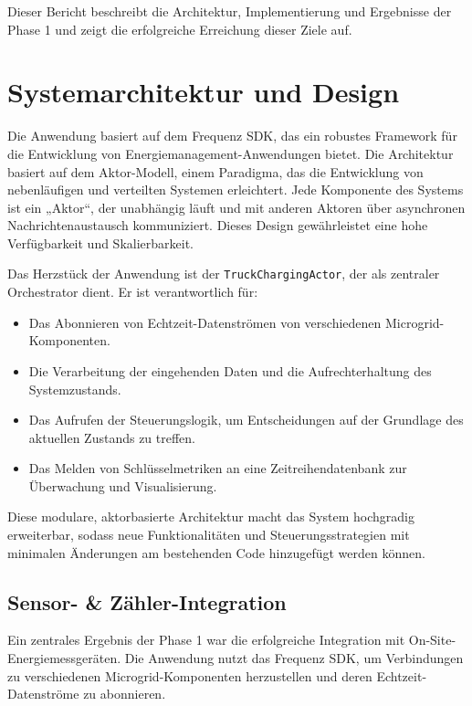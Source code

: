 \documentclass{article}
\begin{document}
Dieser Bericht beschreibt die Architektur, Implementierung und Ergebnisse der Phase 1 und zeigt die erfolgreiche Erreichung dieser Ziele auf.

\section{Systemarchitektur und Design}
Die Anwendung basiert auf dem Frequenz SDK, das ein robustes Framework für die Entwicklung von Energiemanagement-Anwendungen bietet. Die Architektur basiert auf dem Aktor-Modell, einem Paradigma, das die Entwicklung von nebenläufigen und verteilten Systemen erleichtert. Jede Komponente des Systems ist ein „Aktor“, der unabhängig läuft und mit anderen Aktoren über asynchronen Nachrichtenaustausch kommuniziert. Dieses Design gewährleistet eine hohe Verfügbarkeit und Skalierbarkeit.

Das Herzstück der Anwendung ist der \texttt{TruckChargingActor}, der als zentraler Orchestrator dient. Er ist verantwortlich für:
\begin{itemize}
    \item Das Abonnieren von Echtzeit-Datenströmen von verschiedenen Microgrid-Komponenten.
    \item Die Verarbeitung der eingehenden Daten und die Aufrechterhaltung des Systemzustands.
    \item Das Aufrufen der Steuerungslogik, um Entscheidungen auf der Grundlage des aktuellen Zustands zu treffen.
    \item Das Melden von Schlüsselmetriken an eine Zeitreihendatenbank zur Überwachung und Visualisierung.
\end{itemize}

Diese modulare, aktorbasierte Architektur macht das System hochgradig erweiterbar, sodass neue Funktionalitäten und Steuerungsstrategien mit minimalen Änderungen am bestehenden Code hinzugefügt werden können.

\subsection{Sensor- \& Zähler-Integration}
Ein zentrales Ergebnis der Phase 1 war die erfolgreiche Integration mit On-Site-Energiemessgeräten. Die Anwendung nutzt das Frequenz SDK, um Verbindungen zu verschiedenen Microgrid-Komponenten herzustellen und deren Echtzeit-Datenströme zu abonnieren.
\end{document}
